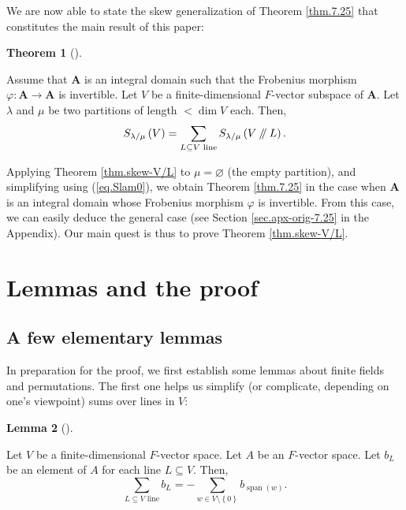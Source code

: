 \documentclass[numbers=enddot,12pt,final,onecolumn,notitlepage]{scrartcl}%
\numberwithin{exer}{section}
\theoremstyle{definition}
\newtheorem{theo}{Theorem}[section]
\newenvironment{theorem}[1][]
{\begin{theo}[#1]\begin{leftbar}}
{\end{leftbar}\end{theo}}
\newtheorem{lem}[theo]{Lemma}
\newenvironment{lemma}[1][]
{\begin{lem}[#1]\begin{leftbar}}
{\end{leftbar}\end{lem}}
\let\sumnonlimits\sum
\renewcommand{\sum}{\sumnonlimits\limits}
\newcommand{\sslash}{\mathbin{/\mkern-5mu/}}
\theoremstyle{plainsl}
\begin{document}
We are now able to state the skew generalization of Theorem \ref{thm.7.25}
that constitutes the main result of this paper:

\begin{theorem}
\label{thm.skew-V/L}Assume that $\mathbf{A}$ is an integral domain such that
the Frobenius morphism $\varphi:\mathbf{A}\rightarrow\mathbf{A}$ is
invertible. Let $V$ be a finite-dimensional $F$-vector subspace of
$\mathbf{A}$. Let $\lambda$ and $\mu$ be two partitions of length $<\dim V$
each. Then,%
\[
S_{\lambda/\mu}\left(  V\right)  =\sum_{L\subseteq V\text{ line}}%
S_{\lambda/\mu}\left(  V\sslash L\right)  .
\]

\end{theorem}

Applying Theorem \ref{thm.skew-V/L} to $\mu=\varnothing$ (the empty
partition), and simplifying using (\ref{eq.Slam0}), we obtain Theorem
\ref{thm.7.25} in the case when $\mathbf{A}$ is an integral domain whose
Frobenius morphism $\varphi$ is invertible. From this case, we can easily
deduce the general case (see Section \ref{sec.apx-orig-7.25} in the Appendix).
Our main quest is thus to prove Theorem \ref{thm.skew-V/L}.

\section{Lemmas and the proof}

\subsection{A few elementary lemmas}

In preparation for the proof, we first establish some lemmas about finite
fields and permutations. The first one helps us simplify (or complicate,
depending on one's viewpoint) sums over lines in $V$:

\begin{lemma}
\label{lem.linesum}Let $V$ be a finite-dimensional $F$-vector space. Let $A$
be an $F$-vector space. Let $b_{L}$ be an element of $A$ for each line
$L\subseteq V$. Then,%
\[
\sum_{L\subseteq V\text{ line}}b_{L}=-\sum_{w\in V\setminus\left\{  0\right\}
}b_{\operatorname*{span}\left(  w\right)  }.
\]

\end{lemma}
\end{document}
